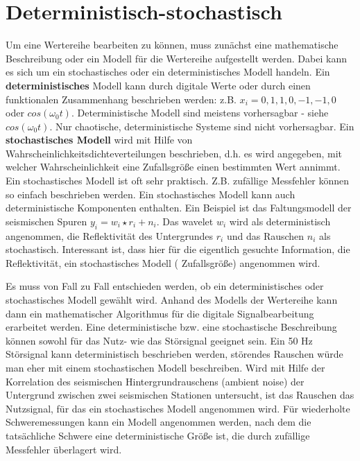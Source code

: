 \section{Deterministisch-stochastisch}
Um eine Wertereihe bearbeiten zu können, muss zunächst eine mathematische Beschreibung oder ein Modell für die Wertereihe aufgestellt werden. Dabei kann es sich um ein stochastisches oder ein deterministisches Modell handeln. Ein {\bf deterministisches} Modell kann durch digitale Werte oder durch einen funktionalen Zusammenhang beschrieben werden: z.B. ${x_i} = {0,1,1,0,-1,-1,0}$ oder $cos(\omega_0t)$. Deterministische Modell sind meistens vorhersagbar - siehe $cos(\omega_0t)$. Nur chaotische, deterministische Systeme sind nicht vorhersagbar. Ein {\bf stochastisches Modell } wird mit Hilfe von Wahrscheinlichkeitsdichteverteilungen beschrieben, d.h. es wird angegeben, mit welcher Wahrscheinlichkeit eine Zufallsgröße einen bestimmten Wert annimmt. Ein stochastisches Modell ist oft sehr praktisch. Z.B. zufällige Messfehler können so einfach beschrieben werden. Ein stochastisches Modell kann auch deterministische Komponenten enthalten. Ein Beispiel ist das Faltungsmodell der seismischen Spuren $y_i = w_i \star r_i + n_i$. Das wavelet $w_i$ wird als deterministisch angenommen, die Reflektivität des Untergrundes $r_i$ und das Rauschen $n_i$ als stochastisch. Interessant ist, dass hier für die eigentlich gesuchte Information, die Reflektivität, ein stochastisches Modell ( Zufallsgröße) angenommen wird. 

Es muss von Fall zu Fall entschieden werden, ob ein deterministisches oder stochastisches Modell gewählt wird. Anhand des Modells der Wertereihe kann dann ein mathematischer Algorithmus für die digitale Signalbearbeitung erarbeitet werden. Eine deterministische bzw. eine stochastische Beschreibung können sowohl für das Nutz- wie das Störsignal geeignet sein. Ein 50 Hz Störsignal kann deterministisch beschrieben werden, störendes Rauschen würde man eher mit einem stochastischen Modell beschreiben. Wird mit Hilfe der Korrelation des seismischen Hintergrundrauschens (ambient noise) der Untergrund zwischen zwei seismischen Stationen untersucht, ist das Rauschen das Nutzsignal, für das ein stochastisches Modell angenommen wird. Für wiederholte Schweremessungen kann ein Modell angenommen werden, nach dem die tatsächliche Schwere eine deterministische Größe ist, die durch zufällige Messfehler überlagert wird. 

